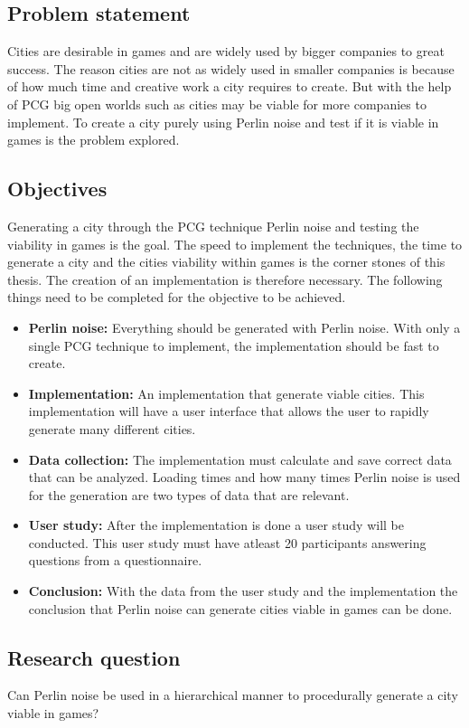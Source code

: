 	\subsection{Problem statement}
	Cities are desirable in games and are widely used by bigger companies to great success. The reason cities are not as widely used in smaller companies is because of how much time and creative work a city requires to create. But with the help of PCG big open worlds such as cities may be viable for more companies to implement.
	To create a city purely using Perlin noise and test if it is viable in games is the problem explored.
	
	\subsection{Objectives}
	Generating a city through the PCG technique Perlin noise and testing the viability in games is the goal. The speed to implement the techniques, the time to generate a city and the cities viability within games is the corner stones of this thesis. The creation of an implementation is therefore necessary.
	The following things need to be completed for the objective to be achieved.
	
	\begin{itemize}
		\item \textbf{Perlin noise:} Everything should be generated with Perlin noise.
		With only a single PCG technique to implement, the implementation should be fast to create.
		
		\item \textbf{Implementation:} An implementation that generate viable cities. This implementation will have a user interface that allows the user to rapidly generate many different cities.
		
		\item \textbf{Data collection:} The implementation must calculate and save correct data that can be analyzed. Loading times and how many times Perlin noise is used for the generation are two types of data that are relevant.
		
		\item \textbf{User study:} After the implementation is done a user study will be conducted. This user study must have atleast 20 participants answering questions from a questionnaire.
		
		\item \textbf{Conclusion: } With the data from the user study and the implementation the conclusion that Perlin noise can generate cities viable in games can be done.
	\end{itemize} 
	
	\subsection{Research question}
	Can Perlin noise be used in a hierarchical manner to procedurally generate a city viable in games?
